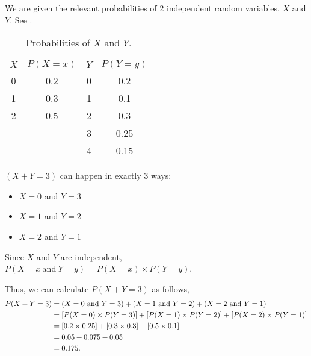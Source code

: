 \begin{subquestions}
\subquestion

We are given the relevant probabilities of 2 independent random variables, $X$ and $Y$. See .
\begin{table}[H]
	\centering
	\begin{tabular}{|c|c|c|c|}
		\hline
		$X$ & $P(X=x)$ & $Y$ & $P(Y=y)$ \\
		\hline
		0 & 0.2 & 0 & 0.2 \\
		1 & 0.3 & 1 & 0.1 \\
		2 & 0.5 & 2 & 0.3 \\
		  &     & 3 & 0.25 \\
		  &     & 4 & 0.15 \\
		  \hline
	\end{tabular}
	\caption{\label{2014:q4:Tab1} Probabilities of $X$ and $Y$.}
\end{table}

\begin{subsubquestions} 

\subsubquestion

$(X+Y=3)$ can happen in exactly 3 ways:
\begin{itemize}
	\item $X = 0$ and $Y = 3$
	\item $X = 1$ and $Y = 2$
	\item $X = 2$ and $Y = 1$
\end{itemize}

Since $X$ and $Y$ are independent, $P(X=x ~\text{and}~ Y=y) = P(X=x) \times P(Y=y)$.

Thus, we can calculate $P(X+Y=3)$ as follows,
\begin{align}
	P(X+Y=3) & = (X=0 ~\text{and}~ Y=3) + (X=1 ~\text{and}~ Y=2) + (X=2 ~\text{and}~ Y=1) \nonumber \\
	         & = [P(X=0) \times P(Y=3)] + [P(X=1) \times P(Y=2)] + [P(X=2) \times P(Y=1)] \nonumber \\
	         & = [0.2 \times 0.25] + [0.3 \times 0.3] + [0.5 \times 0.1] \nonumber \\ 
	         & = 0.05 + 0.075+0.05 \nonumber \\
	         & = 0.175.
\end{align}


\subsubquestion

\begin{subsubsubquestions}
	
\subsubsubquestion


\end{subsubsubquestions}
\end{subsubquestions}
\end{subquestions}
